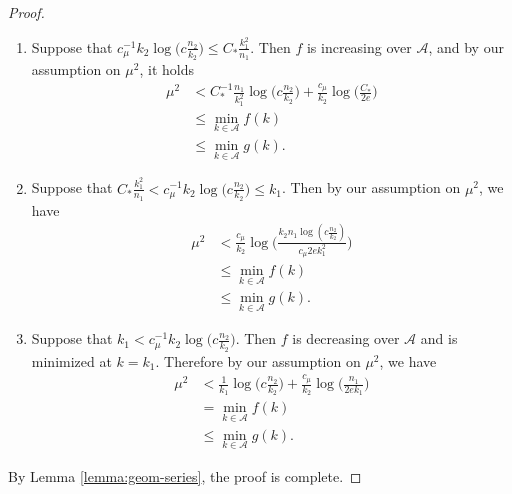 \documentclass{article}
\newcommand{\cA}{\mathcal{A}}
\newcommand{\Ct}{C_{*}}
\begin{document}
\begin{proof}
    \begin{enumerate}
        \item Suppose that $c_\mu^{-1}k_2\log\big(c\frac{n_2}{k_2}\big) \leq \Ct \frac{k_1^2}{n_1}$. Then $f$ is increasing over $\mathcal{A}$, and by our assumption on $\mu^2$, it holds
        \begin{align*}\mu^2 &< \Ct^{-1}\frac{n_1}{k_1^2}\log\Big(c \frac{n_2}{k_2}\Big) + \frac{c_\mu}{k_2}\log\Big(\frac{\Ct}{2e}\Big) \\
        &\leq \min_{k \in \cA}f(k) \\
        &\leq \min_{k \in \cA}g(k).
        \end{align*}
        \item Suppose that $\Ct \frac{k_1^2}{n_1} < c_\mu^{-1}k_2\log\big(c\frac{n_2}{k_2}\big) \leq k_1$. Then by our assumption on $\mu^2$, we have
        \begin{align*}
            \mu^2 &< \frac{c_\mu}{k_2}\log\Big(\frac{k_2n_1\log(c \frac{n_2}{k_2})}{c_\mu 2e k_1^2}\Big)\\
        &\leq \min_{k \in \cA}f(k) \\
        &\leq \min_{k \in \cA}g(k).
        \end{align*}
        \item Suppose that $k_1 < c_\mu^{-1}k_2\log\big(c\frac{n_2}{k_2}\big)$. Then $f$ is decreasing over $\mathcal{A}$ and is minimized at $k = k_1$. Therefore by our assumption on $\mu^2$, we have 
        \begin{align*}
            \mu^2 &< \frac{1}{k_1}\log\big(c \frac{n_2}{k_2}\big) + \frac{c_\mu}{k_2}\log\big(\frac{n_1}{2ek_1}\big)\\
        &= \min_{k \in \cA}f(k) \\
        &\leq \min_{k \in \cA}g(k).
        \end{align*}
    \end{enumerate}
    By Lemma \ref{lemma:geom-series}, the proof is complete.
\end{proof}
\end{document}

